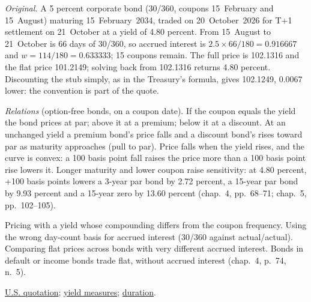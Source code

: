 \begin{qfmethod}
\emph{Original.} A 5 percent corporate bond (30/360, coupons 15~February and 15~August) maturing 15~February~2034, traded on 20~October~2026 for T+1 settlement on 21~October at a yield of 4.80 percent. From 15~August to 21~October is 66 days of 30/360, so accrued interest is $2.5\times66/180=0.916667$ and $w=114/180=0.633333$; 15 coupons remain. The full price is 102.1316 and the flat price 101.2149; solving back from 102.1316 returns 4.80 percent. Discounting the stub simply, as in the Treasury's formula, gives 102.1249, 0.0067 lower: the convention is part of the quote.

 \emph{Relations} (option-free bonds, on a coupon date). If the coupon equals the yield the bond prices at par; above it at a premium; below it at a discount. At an unchanged yield a premium bond's price falls and a discount bond's rises toward par as maturity approaches (pull to par). Price falls when the yield rises, and the curve is convex: a 100 basis point fall raises the price more than a 100 basis point rise lowers it. Longer maturity and lower coupon raise sensitivity: at 4.80 percent, +100 basis points lowers a 3-year par bond by 2.72 percent, a 15-year par bond by 9.93 percent and a 15-year zero by 13.60 percent (chap.~4, pp.~68--71; chap.~5, pp.~102--105).

 Pricing with a yield whose compounding differs from the coupon frequency. Using the wrong day-count basis for accrued interest (30/360 against actual/actual). Comparing flat prices across bonds with very different accrued interest. Bonds in default or income bonds trade flat, without accrued interest (chap.~4, p.~74, n.~5).

 \hyperref[conv:us-rate-quotation]{U.S. quotation}; \hyperref[def:bond-yield-spread-measures]{yield measures}; \hyperref[meth:yield-duration-pvbp]{duration}.

\end{qfmethod}

